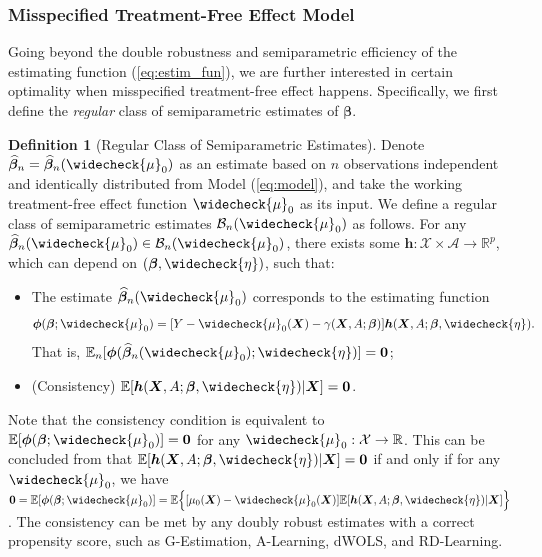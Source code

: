 \documentclass[11pt]{article}
\theoremstyle{definition}
\newtheorem{dfn}{Definition}
\theoremstyle{remark}
\newcommand{\bh}{\bm{h}}
\newcommand{\bX}{\bm{X}}
\newcommand{\bbeta}{\bm{\beta}}
\newcommand{\bphi}{\bm{\phi}}
\newcommand{\bbE}{\mathbb{E}}
\newcommand{\bbR}{\mathbb{R}}
\newcommand{\cA}{\mathcal{A}}
\newcommand{\cB}{\mathcal{B}}
\newcommand{\cX}{\mathcal{X}}
\newcommand{\bzero}{\mathbf{0}}	%
\begin{document}
\subsubsection{Misspecified Treatment-Free Effect Model}\label{sec:asymptotic_misspecified}

Going beyond the double robustness and semiparametric efficiency of the estimating function (\ref{eq:estim_fun}), we are further interested in certain optimality when misspecified treatment-free effect happens. Specifically, we first define the \textit{regular} class of semiparametric estimates of $ \bbeta $.

\begin{dfn}[Regular Class of Semiparametric Estimates]\label{dfn:regular}
	Denote $ \widehat{\bbeta}_{n}=\widehat{\bbeta}_{n}(\widecheck{\mu}_{0}) $ as an estimate based on $ n $ observations independent and identically distributed from Model (\ref{eq:model}), and take the working treatment-free effect function $ \widecheck{\mu}_{0} $ as its input. We define a regular class of semiparametric estimates $ \cB_{n}(\widecheck{\mu}_{0}) $ as follows. For any $ \widehat{\bbeta}_{n}(\widecheck{\mu}_{0}) \in \cB_{n}(\widecheck{\mu}_{0}) $, there exists some $ \bh:\cX \times \cA \to \bbR^{p} $, which can depend on $ (\bbeta,\widecheck{\eta}) $, such that:
	\begin{itemize}
		\item The estimate $ \widehat{\bbeta}_{n}(\widecheck{\mu}_{0}) $ corresponds to the estimating function
		\[ \bphi(\bbeta;\widecheck{\mu}_{0}) = [Y - \widecheck{\mu}_{0}(\bX) - \gamma(\bX,A;\bbeta)]\bh(\bX,A;\bbeta,\widecheck{\eta}). \]
		That is, $ \bbE_{n}[\bphi(\widehat{\bbeta}_{n}(\widecheck{\mu}_{0});\widecheck{\eta})] = \bzero $;
		
		\item (Consistency) $ \bbE[\bh(\bX,A;\bbeta,\widecheck{\eta})|\bX] = \bzero $.
	\end{itemize}
\end{dfn}

Note that the consistency condition is equivalent to $ \bbE[\bphi(\bbeta;\widecheck{\mu}_{0})] = \bzero $ for any $ \widecheck{\mu}_{0}:\cX \to \bbR $. This can be concluded from that $ \bbE[\bh(\bX,A;\bbeta,\widecheck{\eta})|\bX] = \bzero $ if and only if for any $ \widecheck{\mu}_{0}$, we have $ \bzero = \bbE[\bphi(\bbeta;\widecheck{\mu}_{0})] = \bbE\Big\{ [\mu_{0}(\bX) - \widecheck{\mu}_{0}(\bX)]\bbE[\bh(\bX,A;\bbeta,\widecheck{\eta})|\bX] \Big\} $. The consistency can be met by any doubly robust estimates with a correct propensity score, such as G-Estimation, A-Learning, dWOLS, and RD-Learning.
\end{document}
